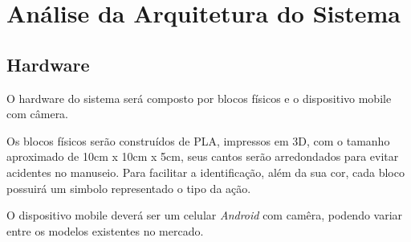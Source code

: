     
    
    
    


\section{Análise da Arquitetura do Sistema}

    \subsection{Hardware}
    O hardware do sistema será composto por blocos físicos e o dispositivo mobile com câmera.
    
    Os blocos físicos serão construídos de PLA, impressos em 3D, com o tamanho aproximado de 10cm x 10cm x 5cm, seus cantos serão arredondados para evitar acidentes no manuseio. Para facilitar a identificação, além da sua cor, cada bloco possuirá um simbolo representado o tipo da ação.
    
    O dispositivo mobile deverá ser um celular \textit{Android} com camêra, podendo variar entre os modelos existentes no mercado.
    

